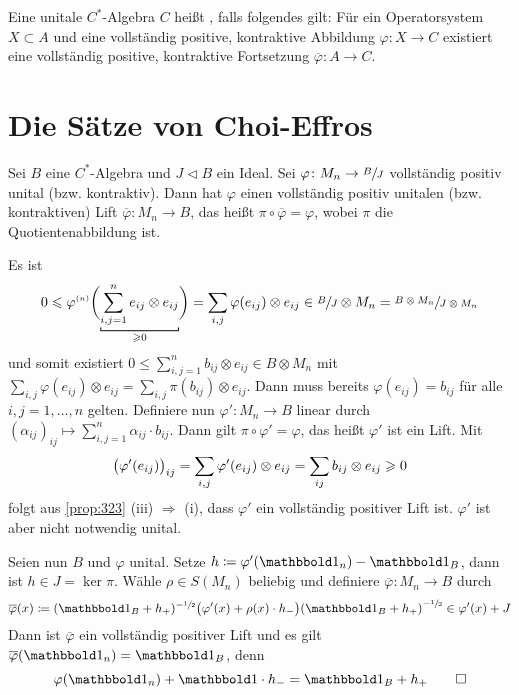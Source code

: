 \begin{definition}[{name=[injektive C*-Algebra]}]
	Eine unitale $C^*$-Algebra $C$ heißt , falls folgendes gilt:
	Für ein Operatorsystem $X \subset A$ und eine vollständig positive, kontraktive Abbildung $\varphi \colon X \to C$ existiert eine vollständig positive, kontraktive Fortsetzung $\overline{\varphi} \colon A \to C$.
\end{definition}
\newpage

\section{Die Sätze von Choi-Effros} %
\label{sec:4}

\begin{proposition}
	Sei $B$ eine $C^*$-Algebra und $J \lhd B$ ein Ideal.
	Sei $\varphi \colon M_n \to \sfrac{B}{J}$ vollständig positiv  unital (bzw. kontraktiv).
	Dann hat $\varphi$ einen vollständig positiv unitalen (bzw. kontraktiven) Lift $\overline{\varphi} \colon M_n \to B$, das heißt $\pi \circ \overline{\varphi} = \varphi$, wobei $\pi$ die Quotientenabbildung ist.
\end{proposition}
\begin{beweis}
	Es ist 
	\[
		0 \le \varphi^\ssbrace{n}\enbrace[\bigg]{\Underbracket{\sum_{i,j=1}^{n} e_{ij} \otimes e_{ij}}{\ge 0}} = \sum_{i,j} \varphi(e_{ij}) \otimes e_{ij} \in \sfrac{B}{J} \otimes M_n = \sfrac{B \otimes M_n}{J \otimes M_n}
	\]
	und somit existiert $0 \le \sum_{i,j=1}^{n} b_{ij} \otimes e_{ij} \in B \otimes M_n$ mit $\sum_{i,j} \varphi(e_{ij}) \otimes e_{ij} = \sum_{i,j} \pi(b_{ij}) \otimes e_{ij}$.
	Dann muss bereits $\varphi(e_{ij})=b_{ij}$ für alle $i,j=1,\ldots,n$ gelten.
	Definiere nun $\varphi' \colon M_n \to B$ linear durch $(\alpha_{ij})_{ij} \mapsto \sum_{i,j=1}^{n} \alpha_{ij} \cdot b_{ij}$.
	Dann gilt $\pi \circ \varphi' = \varphi$, das heißt $\varphi'$ ist ein Lift.
	Mit 
	\[
		\enbrace[\big]{\varphi'(e_{ij})}_{ij} = \sum_{i,j} \varphi'(e_{ij}) \otimes e_{ij} = \sum_{ij} b_{ij} \otimes e_{ij} \ge 0
	\]
	folgt aus \autoref{prop:323} (iii) $\Rightarrow$ (i), dass $\varphi'$ ein vollständig positiver Lift ist.
	$\varphi'$ ist aber nicht notwendig unital.
	
	Seien nun $B$ und $\varphi$ unital.
	Setze $h \coloneqq \varphi' (\ind_n) - \ind_B$, dann ist $h \in J = \ker \pi$.
	Wähle $\rho \in S(M_n)$ beliebig und definiere $\overline{\varphi} \colon M_n \to B$ durch
	\[
		\overline{\varphi}(x) \coloneqq (\ind_B + h_+)^{-\sfrac{1}{2}}\enbrace[\big]{\varphi'(x)+ \rho(x) \cdot h_-} \enbrace*{\ind_B + h_+}^{-\sfrac{1}{2}} \in \varphi'(x) + J
	\]
	Dann ist $\overline{\varphi}$ ein vollständig positiver Lift und es gilt $\overline{\varphi}(\ind_n) = \ind_B$, denn
	\[
		\varphi(\ind_n) + \ind \cdot h_- = \ind_B + h_+ \qedhere
	\]
\end{beweis}


